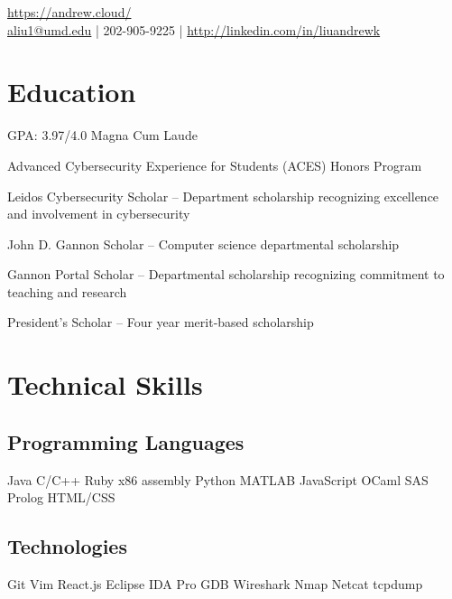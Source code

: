 \documentclass[]{template}
\begin{document}
\lastupdated

{
  \url{https://andrew.cloud/} \\
  \href{mailto:aliu1@umd.edu}{aliu1@umd.edu} | 202-905-9225 | \href{http://linkedin.com/in/liuandrewk}{http://linkedin.com/in/liuandrewk}
}

\section{Education}
GPA: 3.97/4.0 \textbullet{} Magna Cum Laude
\begin{tightemize}
\item Advanced Cybersecurity Experience for Students (ACES) Honors Program
\item Leidos Cybersecurity Scholar – Department scholarship recognizing excellence and involvement in cybersecurity
\item John D. Gannon Scholar – Computer science departmental scholarship
\item Gannon Portal Scholar – Departmental scholarship recognizing commitment to teaching and research
\item President’s Scholar – Four year merit-based scholarship
\end{tightemize}
\sectionsep

\section{Technical Skills}
\begin{minipage}[t]{.45\textwidth}
\subsection{Programming Languages}
Java
\textbullet{} C/C++
\textbullet{} Ruby
\textbullet{} x86  assembly
\textbullet{} Python
\textbullet{} MATLAB
\textbullet{} JavaScript
\textbullet{} OCaml
\textbullet{} SAS
\textbullet{} Prolog
\textbullet{} HTML/CSS
\sectionsep
\end{minipage}
\hfill
\begin{minipage}[t]{.45\textwidth}
\subsection{Technologies}
Git
\textbullet{} Vim
\textbullet{} React.js
\textbullet{} Eclipse
\textbullet{} IDA  Pro
\textbullet{} GDB
\textbullet{} Wireshark
\textbullet{} Nmap
\textbullet{} Netcat
\textbullet{} tcpdump
\end{minipage}
\end{document}
